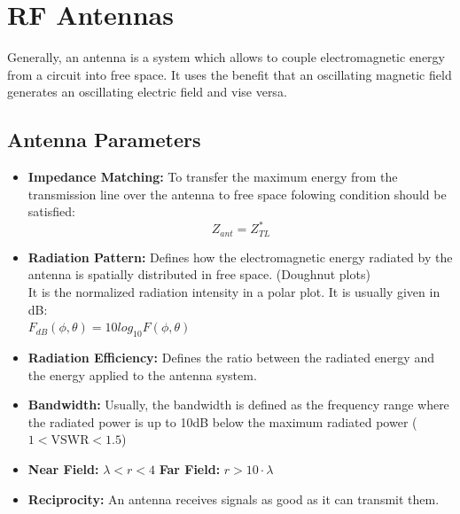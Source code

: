 \section{RF Antennas}
Generally, an antenna is a system which allows to couple electromagnetic energy from a circuit into free space. It uses the benefit that an oscillating magnetic field generates an oscillating electric field and vise versa.

\subsection{Antenna Parameters}

\begin{minipage}{10cm}
\begin{itemize}
	\item \textbf{Impedance Matching:} To transfer the maximum energy from the transmission line over the antenna to free space folowing condition should be satisfied:
	\begin{equation}
	Z_{ant} = Z^*_{TL} 
	\end{equation}
	\item \textbf{Radiation Pattern:} Defines how the electromagnetic energy radiated by the antenna is spatially distributed in free space. (Doughnut plots)\\ It is the normalized radiation intensity in a polar plot. It is usually given in dB: \\
	$F_{dB}(\phi,\theta)=10log_{10}F(\phi,\theta)$
	\item \textbf{Radiation Efficiency:} Defines the ratio between the radiated energy and the energy applied to the antenna system.
	\item \textbf{Bandwidth:} Usually, the bandwidth is defined as the frequency range where the radiated power is up to 10dB below the maximum radiated power ( $1<\textrm{VSWR}<1.5$)
	\item \textbf{Near Field:} $\lambda < r < 4$	\hspace{2cm} \textbf{Far Field:} $ r > 10\cdot \lambda$
	\item \textbf{Reciprocity:} An antenna receives signals as good as it can transmit them.

\end{itemize}
\end{minipage}
